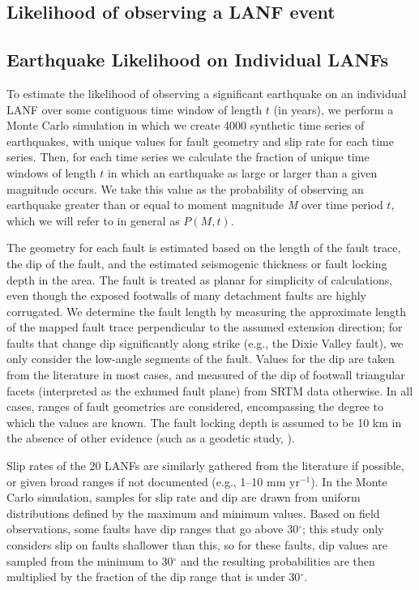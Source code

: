 \documentclass[draft,grl]{AGUTeX}
\begin{document}
\begin{article}
\section{Likelihood of observing a LANF event}
\subsection{Earthquake Likelihood on Individual LANFs}
To estimate the likelihood of observing a significant earthquake on an
individual LANF over some contiguous time window of length $t$ (in
years), we perform a Monte Carlo simulation in which we create 4000
synthetic time series of earthquakes, with unique values for fault
geometry and slip rate for each time series. Then, for each time
series we calculate the fraction of unique time windows of length $t$
in which an earthquake as large or larger than a given magnitude
occurs.  We take this value as the probability of observing an
earthquake greater than or equal to moment magnitude \emph{M} over
time period $t$, which we will refer to in general as $P(M,t)$.

The geometry for each fault is estimated based on the length of the
fault trace, the dip of the fault, and the estimated seismogenic
thickness or fault locking depth in the area.  The fault is treated as
planar for simplicity of calculations, even though the exposed
footwalls of many detachment faults are highly corrugated.  We
determine the fault length by measuring the approximate length of the
mapped fault trace perpendicular to the assumed extension direction;
for faults that change dip significantly along strike (e.g., the Dixie
Valley fault), we only consider the low-angle segments of the fault.
Values for the dip are taken from the literature in most cases, and
measured of the dip of footwall triangular facets (interpreted as the exhumed
fault plane) from SRTM data otherwise. In all cases, ranges of fault
geometries are considered, encompassing the degree to which the values are 
known. The fault locking depth is assumed to be 10 km in the absence of other
evidence (such as a geodetic study, \citep[e.g.,][]{hreinsdottir2009altotib}).

Slip rates of the 20 LANFs are similarly gathered from the
literature if possible, or given broad ranges if not documented
(e.g., 1--10 mm yr$^{-1}$).  In the Monte Carlo simulation, samples
for slip rate and dip are drawn from uniform distributions defined
by the maximum and minimum values.  Based on field observations,
some faults have dip ranges that go above 30$^\circ$; this study
only considers slip on faults shallower than this, so for these
faults, dip values are sampled from the minimum to 30$^\circ$ and
the resulting probabilities are then multiplied by the fraction of
the dip range that is under 30$^\circ$.


\end{article}
\end{document}
